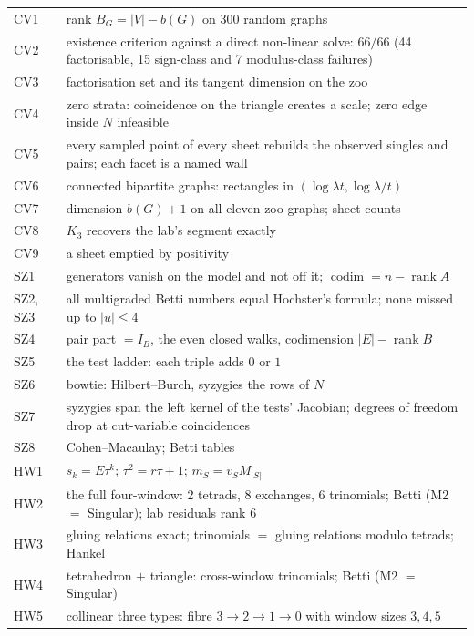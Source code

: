 \documentclass[11pt]{article}
\theoremstyle{definition}\newtheorem{definition}[theorem]{Definition}\newtheorem{remark}[theorem]{Remark}\newtheorem{example}[theorem]{Example}
\begin{document}
\begin{center}\small
\begin{tabular}{lp{}}\toprule
CV1 & rank $B_G=|V|-b(G)$ on $300$ random graphs\\
CV2 & existence criterion against a direct non-linear solve: $66/66$ (44 factorisable, 15 sign-class and 7 modulus-class failures)\\
CV3 & factorisation set and its tangent dimension on the zoo\\
CV4 & zero strata: coincidence on the triangle creates a scale; zero edge inside $N$ infeasible\\
CV5 & every sampled point of every sheet rebuilds the observed singles and pairs; each facet is a named wall\\
CV6 & connected bipartite graphs: rectangles in $(\log\lambda t,\log\lambda/t)$\\
CV7 & dimension $b(G)+1$ on all eleven zoo graphs; sheet counts\\
CV8 & $K_3$ recovers the lab's segment exactly\\
CV9 & a sheet emptied by positivity\\\midrule
SZ1 & generators vanish on the model and not off it; $\operatorname{codim}=n-\operatorname{rank}A$\\
SZ2, SZ3 & all multigraded Betti numbers equal Hochster's formula; none missed up to $|u|\le4$\\
SZ4 & pair part $=I_B$, the even closed walks, codimension $|E|-\operatorname{rank}B$\\
SZ5 & the test ladder: each triple adds $0$ or $1$\\
SZ6 & bowtie: Hilbert--Burch, syzygies the rows of $N$\\
SZ7 & syzygies span the left kernel of the tests' Jacobian; degrees of freedom drop at cut-variable coincidences\\
SZ8 & Cohen--Macaulay; Betti tables\\\midrule
HW1 & $s_k=E\tau^k$; $\tau^2=r\tau+1$; $m_S=v_SM_{|S|}$\\
HW2 & the full four-window: 2 tetrads, 8 exchanges, 6 trinomials; Betti (M2 $=$ Singular); lab residuals rank $6$\\
HW3 & gluing relations exact; trinomials $=$ gluing relations modulo tetrads; Hankel\\
HW4 & tetrahedron $+$ triangle: cross-window trinomials; Betti (M2 $=$ Singular)\\
HW5 & collinear three types: fibre $3\to2\to1\to0$ with window sizes $3,4,5$\\

\end{tabular}
\end{center}
\end{document}
